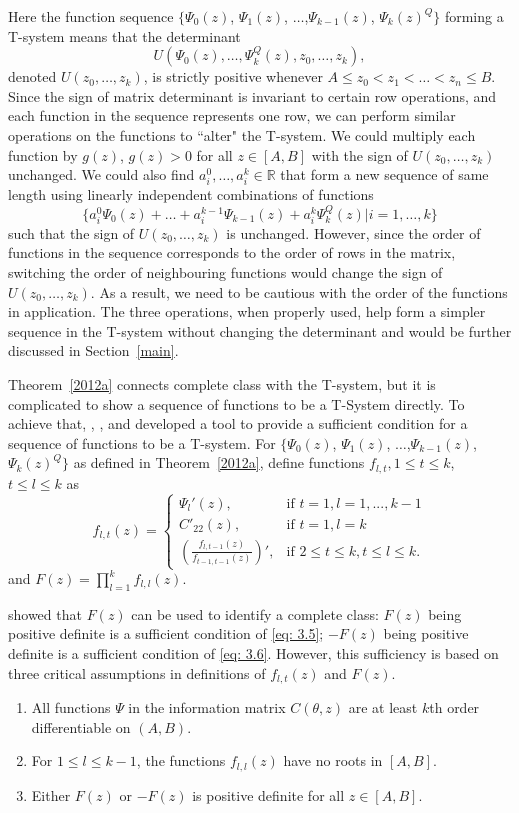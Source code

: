 \documentclass[12pt]{amsart}
\theoremstyle{definition}
\theoremstyle{remark}
\numberwithin{equation}{section}
\begin{document}
Here the function sequence $\{\Psi_0(z)$, $\Psi_1(z)$, $\ldots$,$\Psi_{k-1}(z)$, $\Psi_k(z)^Q\}$ forming a T-system means that the determinant \[U(\Psi_0(z),\ldots,\Psi_k^Q(z), z_0,\ldots,z_k),\] denoted $U(z_0,\ldots,z_k)$, is strictly positive whenever $A\le z_0 <z_1< \ldots< z_n\le B$. Since the sign of matrix determinant is invariant to certain row operations, and each function in the sequence represents one row, we can perform similar operations on the functions to ``alter" the T-system.  We could multiply each function by $g(z)$, $g(z)>0$ for all $z\in [A,B]$ with the sign of $U(z_0,\ldots,z_k)$ unchanged. We could also find $a^0_i,\ldots,a^k_i\in \mathbb{R}$ that form a new sequence of same length using linearly independent combinations of functions \[\{a^0_i\Psi_0(z)+\ldots+a^{k-1}_i\Psi_{k-1}(z)+a^k_i\Psi_k^Q(z) | i=1,\ldots,k\}\] such that the sign of $U(z_0,\ldots,z_k)$ is unchanged. However, since the order of functions in the sequence corresponds to the order of rows in the matrix, switching the order of neighbouring functions would change the sign of $U(z_0,\ldots,z_k)$. As a result, we need to be cautious with the order of the functions in application. The three operations, when properly used, help form a simpler sequence in the T-system without changing the determinant and would be further discussed in Section~\ref{main}.


Theorem~\ref{2012a} connects complete class with the T-system, but it is complicated to show a sequence of functions to be a T-System directly. To achieve that, \cite{yang2009}, \cite{yang2010}, and \cite{yang2012} developed a tool to provide a sufficient condition for a sequence of functions to be a T-system. For $\{\Psi_0(z)$, $\Psi_1(z)$, $\ldots$,$\Psi_{k-1}(z)$, $\Psi_k(z)^Q\}$ as defined in Theorem~\ref{2012a}, define functions $f_{l,t}, 1\le t \le k$, $t\le l \le k$ as
\begin{equation}\label{eq: ff}
f_{l,t}(z) = \left \{ \begin{array}{ll}
\Psi_l'(z), & \text{if } t=1,l=1,...,k-1\\
C'_{22}(z), & \text{if } t=1,l=k\\
(\frac{f_{l,t-1}(z)}{f_{t-1,t-1}(z)})', & \text{if } 2\le t\le k, t\le l \le k.
\end{array}\right.
\end{equation}
and   $F(z) = \prod_{l=1}^k f_{l,l}(z)$. 

\cite{yang2012} showed that $F(z)$ can be used to identify a complete class: $F(z)$ being positive definite is a sufficient condition of \eqref{eq: 3.5}; $-F(z)$ being positive definite is a sufficient condition of \eqref{eq: 3.6}. However, this sufficiency is based on three critical assumptions in definitions of $f_{l,t}(z)$ and $F(z)$.
\begin{enumerate}
\item All functions $\Psi$ in the information matrix $C(\theta,z)$ are at least $k$th order differentiable on $(A,B)$.
\item For $1\le l\le k-1$, the functions $f_{l,l}(z)$ have no roots in $[A,B]$.
\item Either $F(z)$ or $-F(z)$ is positive definite for all $z\in [A,B]$.
\end{enumerate} 
\end{document}
